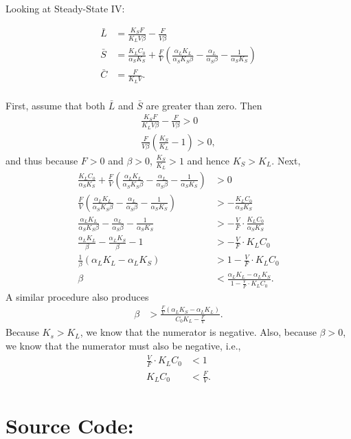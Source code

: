 Looking at {\color{red}Steady-State IV}:

\begin{align*}
  \bar{L} &= \frac{K_S F}{K_L V \beta} - \frac{F}{V \beta} \\
  \bar{S} &= \frac{K_L C_0}{\alpha_S K_S} + \frac{F}{V} \left( \frac{\alpha_L K_L}{\alpha_S K_S \beta} - \frac{\alpha_L}{\alpha_S \beta} - \frac{1}{\alpha_S K_S} \right) \\
  \bar{C} &= \frac{F}{K_L V}. \\
\end{align*} 

First, assume that both $\bar{L}$ and $\bar{S}$ are greater than zero.  Then
\begin{align*}
  \frac{K_S F}{K_L V \beta} - \frac{F}{V \beta} > 0 \\
  \frac{F}{V \beta} \left( \frac{K_S}{K_L} - 1 \right) > 0,
\end{align*}
and thus because $F > 0$ and $\beta > 0$, $\frac{K_S}{K_L} > 1$ and hence $K_S > K_L$.  Next, 
\begin{align*}
  \frac{K_L C_0}{\alpha_S K_S} + \frac{F}{V} \left( \frac{\alpha_L K_L}{\alpha_S K_S \beta} - \frac{\alpha_L}{\alpha_S \beta} - \frac{1}{\alpha_S K_S} \right) &> 0 \\
  \frac{F}{V} \left( \frac{\alpha_L K_L}{\alpha_S K_S \beta} - \frac{\alpha_L}{\alpha_S \beta} - \frac{1}{\alpha_S K_S} \right) &> -\frac{K_L C_0}{\alpha_S K_S} \\
  \frac{\alpha_L K_L}{\alpha_S K_S \beta} - \frac{\alpha_L}{\alpha_S \beta} - \frac{1}{\alpha_S K_S} &> - \frac{V}{F} \cdot \frac{K_L C_0}{\alpha_S K_S} \\
  \frac{\alpha_L K_L}{\beta} - \frac{\alpha_L K_S}{\beta} - 1 &> - \frac{V}{F} \cdot K_L C_0 \\
  \frac{1}{\beta} (\alpha_L K_L - \alpha_L K_S) &> 1 - \frac{V}{F} \cdot K_L C_0 \\
  \beta &< \frac{\alpha_L K_L - \alpha_L K_S}{1 - \frac{V}{F} \cdot K_L C_0}.
\end{align*}
A similar procedure also produces
\begin{align*}
  \beta &> \frac{\frac{F}{V} \left( \alpha_L K_S - \alpha_L K_L \right)}{C_0 K_L - \frac{F}{V}}.
\end{align*}
Because $K_s > K_L$, we know that the numerator is negative.  Also, because $\beta > 0$, we know that the numerator must also be negative, i.e., 
\begin{align*}
  \frac{V}{F} \cdot K_L C_0 &< 1 \\
  K_L C_0 &< \frac{F}{V}.
\end{align*}


\newpage

\section*{Source Code:}





